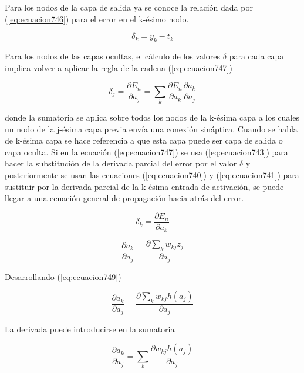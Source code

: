 {Para los nodos de la capa de salida ya se conoce la relación dada por (\ref{eq:ecuacion746}) para el error en el k-ésimo nodo.

\begin{equation}
	\delta_{k}=y_{k} - t_k
	\label{eq:ecuacion746}
\end{equation}

Para los nodos de las capas ocultas, el cálculo de los valores $\delta$ para cada capa implica volver a aplicar la regla de la cadena (\ref{eq:ecuacion747})

\begin{equation}
	\delta_{j}=\frac{\partial{E_n}}{\partial{a_{j}}}=\sum_{k}^{} {\frac{\partial{E_n}}{\partial{a_{k}}} \frac{\partial{a_k}}{\partial{a_{j}}}}
	\label{eq:ecuacion747}
\end{equation}

donde la sumatoria se aplica sobre todos los nodos de la k-ésima capa a los cuales un nodo de la j-ésima capa previa envía una conexión sináptica. Cuando se habla de k-ésima capa se hace referencia a que esta capa puede ser 
capa de salida o capa oculta. Si en la ecuación (\ref{eq:ecuacion747}) se usa (\ref{eq:ecuacion743}) para hacer la substitución de la derivada parcial del error por el valor $\delta$ y posteriormente 
se usan las ecuaciones (\ref{eq:ecuacion740}) y (\ref{eq:ecuacion741}) para sustituir por la derivada parcial de la k-ésima entrada de activación, se puede llegar a una ecuación general de propagación hacia atrás del error.

\begin{equation}
	\delta_{k}=\frac{\partial{E_n}}{\partial{a_{k}}}
	\label{eq:ecuacion748}
\end{equation}

\begin{equation}
	\frac{\partial{a_k}}{\partial{a_{j}}}=\frac{\partial{\sum_{k}^{} {w_{kj} z_j}}}{\partial{a_{j}}}
	\label{eq:ecuacion749}
\end{equation}

Desarrollando (\ref{eq:ecuacion749})

\begin{equation}
	\frac{\partial{a_k}}{\partial{a_{j}}}=\frac{\partial{\sum_{k}^{} {w_{kj} h(a_j)}}}{\partial{a_{j}}}
	\label{eq:ecuacion750}
\end{equation}

La derivada puede introducirse en la sumatoria

\begin{equation}
	\frac{\partial{a_k}}{\partial{a_{j}}}=\sum_{k}^{} {\frac{\partial{w_{kj} h(a_j)}}{\partial{a_{j}}}}
	\label{eq:ecuacion751}
\end{equation}

}
